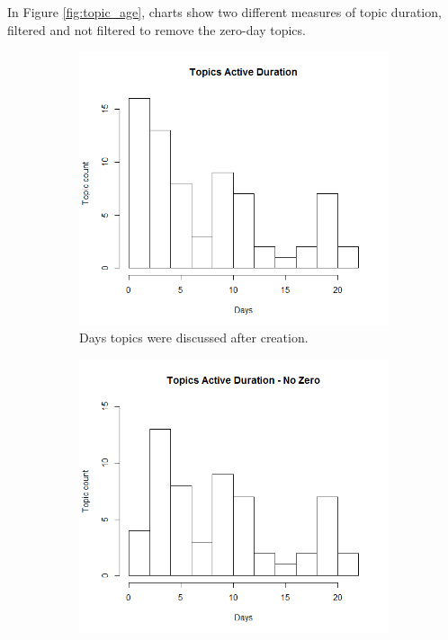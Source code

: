     In Figure \ref{fig:topic_age}, charts show two different measures of 
    topic duration, filtered and not filtered to remove the zero-day topics.

    \begin{figure}
    \centering
      \begin{subfigure}[b]{0.4\textwidth}
        \includegraphics[width=\textwidth]{topic_days_active.png}
        \caption{Days topics were discussed after creation.}
      \end{subfigure}
      \begin{subfigure}[b]{0.4\textwidth}
        \includegraphics[width=\textwidth]{topic_days_active_nz.png}

\end{subfigure}
\end{figure}
